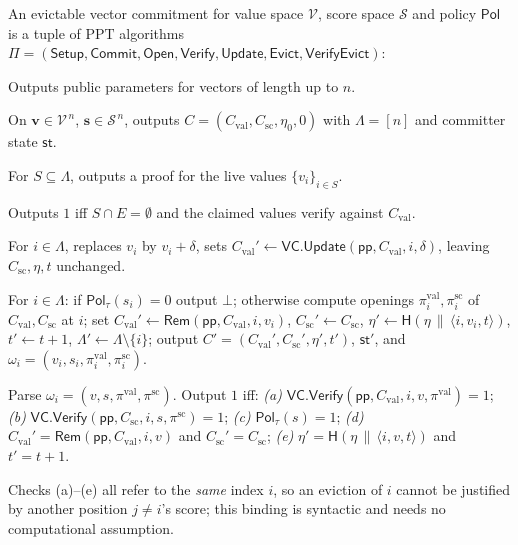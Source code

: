 \documentclass[version=preprint]{iacrcc}
\theoremstyle{definition}
\newcommand{\secpar}{\lambda}
\newcommand{\PPT}{\mathrm{PPT}}
\newcommand{\bit}{\{0,1\}}
\newcommand{\concat}{\,\|\,}
\newcommand{\Setup}{\mathsf{Setup}}
\newcommand{\Commit}{\mathsf{Commit}}
\newcommand{\Open}{\mathsf{Open}}
\newcommand{\Vfy}{\mathsf{Verify}}
\newcommand{\Update}{\mathsf{Update}}
\newcommand{\Evict}{\mathsf{Evict}}
\newcommand{\VfyEvict}{\mathsf{VerifyEvict}}
\newcommand{\Rem}{\mathsf{Rem}}
\newcommand{\pp}{\mathsf{pp}}
\newcommand{\aux}{\mathsf{st}}
\newcommand{\Pol}{\mathsf{Pol}}
\newcommand{\Val}{\mathrm{val}}
\newcommand{\Sc}{\mathrm{sc}}
\newcommand{\Cval}{C_{\Val}}
\newcommand{\Csc}{C_{\Sc}}
\newcommand{\Live}{\Lambda}
\newcommand{\Evicted}{E}
\newcommand{\Vsp}{\mathcal{V}}
\newcommand{\Ssp}{\mathcal{S}}
\newcommand{\hash}{\mathsf{H}}
\newcommand{\VC}{\mathsf{VC}}
\begin{document}
\begin{definition}[EvictVC]\label{def:evictvc}
An evictable vector commitment for value space $\Vsp$, score space $\Ssp$ and
policy $\Pol$ is a tuple of $\PPT$ algorithms
$\Pi=(\Setup,\Commit,\Open,\Vfy,\Update,\Evict,\VfyEvict)$:
\begin{description}[leftmargin=0em,itemsep=4pt]
\item[$\Setup(1^\secpar,1^n)\to\pp$.] Outputs public parameters for vectors of
      length up to $n$.
\item[$\Commit(\pp,\mathbf{v},\mathbf{s})\to(C,\aux)$.] On
      $\mathbf{v}\in\Vsp^{\,n}$, $\mathbf{s}\in\Ssp^{\,n}$, outputs
      $C=(\Cval,\Csc,\eta_0,0)$ with $\Live=[n]$ and committer state $\aux$.
\item[$\Open(\pp,\aux,S)\to\pi$.] For $S\subseteq\Live$, outputs a proof for the
      live values $\{v_i\}_{i\in S}$.
\item[$\Vfy(\pp,C,\Evicted,S,\{v_i\}_{i\in S},\pi)\to\bit$.] Outputs $1$ iff
      $S\cap\Evicted=\emptyset$ and the claimed values verify against $\Cval$.
\item[$\Update(\pp,\aux,i,\delta)\to(C',\aux')$.] For $i\in\Live$, replaces $v_i$
      by $v_i+\delta$, sets $\Cval'\leftarrow\VC.\Update(\pp,\Cval,i,\delta)$,
      leaving $\Csc,\eta,t$ unchanged.
\item[$\Evict(\pp,\aux,i,\tau)\to(C',\aux',\omega_i)$ \textnormal{or} $\bot$.]
      For $i\in\Live$: if $\Pol_\tau(s_i)=0$ output $\bot$; otherwise compute
      openings $\pi_i^{\Val},\pi_i^{\Sc}$ of $\Cval,\Csc$ at $i$; set
      $\Cval'\leftarrow\Rem(\pp,\Cval,i,v_i)$, $\Csc'\leftarrow\Csc$,
      $\eta'\leftarrow\hash(\eta\concat\langle i,v_i,t\rangle)$, $t'\leftarrow t+1$,
      $\Live'\leftarrow\Live\setminus\{i\}$; output $C'=(\Cval',\Csc',\eta',t')$,
      $\aux'$, and $\omega_i=(v_i,s_i,\pi_i^{\Val},\pi_i^{\Sc})$.
\item[$\VfyEvict(\pp,C,i,\tau,\omega_i,C')\to\bit$.] Parse
      $\omega_i=(v,s,\pi^{\Val},\pi^{\Sc})$. Output $1$ iff:
      \emph{(a)} $\VC.\Vfy(\pp,\Cval,i,v,\pi^{\Val})=1$;
      \emph{(b)} $\VC.\Vfy(\pp,\Csc,i,s,\pi^{\Sc})=1$;
      \emph{(c)} $\Pol_\tau(s)=1$;
      \emph{(d)} $\Cval'=\Rem(\pp,\Cval,i,v)$ and $\Csc'=\Csc$;
      \emph{(e)} $\eta'=\hash(\eta\concat\langle i,v,t\rangle)$ and $t'=t+1$.
\end{description}
\end{definition}

\begin{remark}
Checks (a)--(e) all refer to the \emph{same} index $i$, so an eviction of $i$
cannot be justified by another position $j\neq i$'s score; this binding is
syntactic and needs no computational assumption.
\end{remark}
\end{document}
